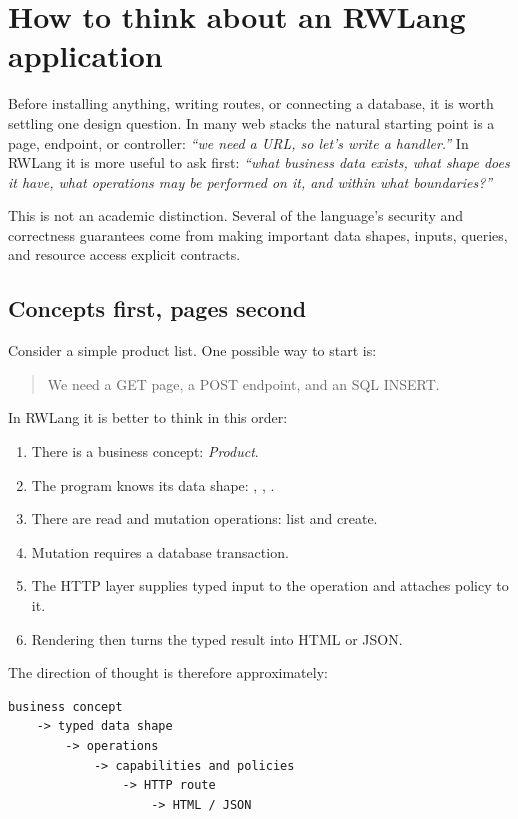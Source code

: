 \chapter{How to think about an RWLang application}

Before installing anything, writing routes, or connecting a database, it is worth settling one design question. In many web stacks the natural starting point is a page, endpoint, or controller: \emph{``we need a  URL, so let's write a handler.''} In RWLang it is more useful to ask first: \emph{``what business data exists, what shape does it have, what operations may be performed on it, and within what boundaries?''}

This is not an academic distinction. Several of the language's security and correctness guarantees come from making important data shapes, inputs, queries, and resource access explicit contracts.

\section{Concepts first, pages second}

Consider a simple product list. One possible way to start is:

\begin{quote}
We need a GET page, a POST endpoint, and an SQL INSERT.
\end{quote}

In RWLang it is better to think in this order:

\begin{enumerate}
  \item There is a business concept: \emph{Product}.
  \item The program knows its data shape: , , .
  \item There are read and mutation operations: list and create.
  \item Mutation requires a database transaction.
  \item The HTTP layer supplies typed input to the operation and attaches policy to it.
  \item Rendering then turns the typed result into HTML or JSON.
\end{enumerate}

The direction of thought is therefore approximately:

\begin{lstlisting}
business concept
    -> typed data shape
        -> operations
            -> capabilities and policies
                -> HTTP route
                    -> HTML / JSON
\end{lstlisting}

